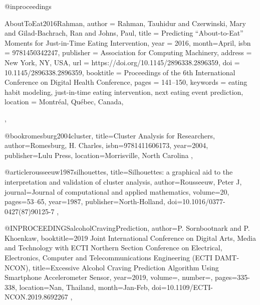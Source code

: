 @inproceedings{AboutToEat2016Rahman,
author = {Rahman, Tauhidur and Czerwinski, Mary and Gilad-Bachrach, Ran and Johns, Paul},
title = {Predicting “About-to-Eat” Moments for Just-in-Time Eating Intervention},
year = {2016},
month={April},
isbn = {9781450342247},
publisher = {Association for Computing Machinery},
address = {New York, NY, USA},
url = {https://doi.org/10.1145/2896338.2896359},
doi = {10.1145/2896338.2896359},
booktitle = {Proceedings of the 6th International Conference on Digital Health Conference},
pages = {141–150},
keywords = {eating habit modeling, just-in-time eating intervention, next eating event prediction},
location = {Montr\'{e}al, Qu\'{e}bec, Canada},

},

@book{romesburg2004cluster,
  title={Cluster Analysis for Researchers},
  author={Romesburg, H. Charles},
  isbn={9781411606173},
  year={2004},
  publisher={Lulu Press},
  location={Morrisville, North Carolina}
},
  
@article{rousseeuw1987silhouettes,
  title={Silhouettes: a graphical aid to the interpretation and validation of cluster analysis},
  author={Rousseeuw, Peter J},
  journal={Journal of computational and applied mathematics},
  volume={20},
  pages={53--65},
  year={1987},
  publisher={North-Holland},
  doi={10.1016/0377-0427(87)90125-7}
},

@INPROCEEDINGS{alcoholCravingPrediction,  
  author={P. {Sornbootnark} and P. {Khoenkaw}},  
  booktitle={2019 Joint International Conference on Digital Arts, Media and Technology with ECTI Northern Section Conference on Electrical, Electronics, Computer and Telecommunications Engineering (ECTI DAMT-NCON)},  
  title={Excessive Alcohol Craving Prediction Algorithm Using Smartphone Accelerometer Sensor},   
  year={2019},  
  volume={},  
  number={},  
  pages={335-338},
  location={Nan, Thailand},
  month={Jan-Feb},
  doi={10.1109/ECTI-NCON.2019.8692267}
},


